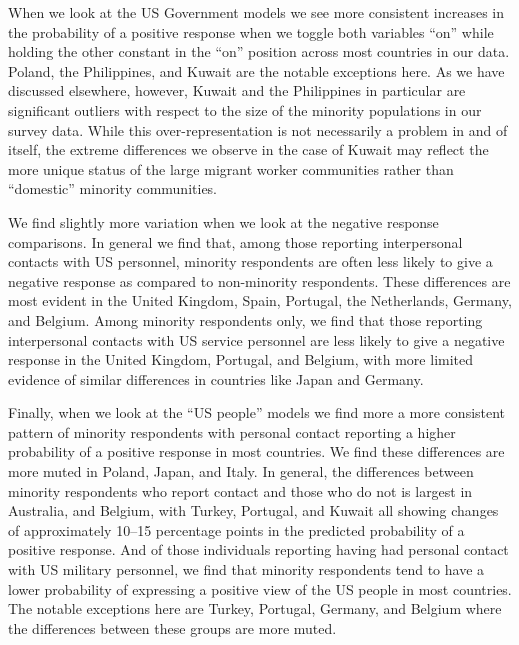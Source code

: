 When we look at the US Government models we see more consistent increases in the probability of a positive response when we toggle both variables ``on'' while holding the other constant in the ``on'' position across most countries in our data. Poland, the Philippines, and Kuwait are the notable exceptions here. As we have discussed elsewhere, however, Kuwait and the Philippines in particular are significant outliers with respect to the size of the minority populations in our survey data. While this over-representation is not necessarily a problem in and of itself, the extreme differences we observe in the case of Kuwait may reflect the more unique status of the large migrant worker communities rather than ``domestic'' minority communities.

We find slightly more variation when we look at the negative response comparisons. In general we find that, among those reporting interpersonal contacts with US personnel, minority respondents are often less likely to give a negative response as compared to non-minority respondents. These differences are most evident in the United Kingdom, Spain, Portugal, the Netherlands, Germany, and Belgium. Among minority respondents only, we find that those reporting interpersonal contacts with US service personnel are less likely to give a negative response in the United Kingdom, Portugal, and Belgium, with more limited evidence of similar differences in countries like Japan and Germany.

Finally, when we look at the ``US people'' models we find more a more consistent pattern of minority respondents with personal contact reporting a higher probability of a positive response in most countries. We find these differences are more muted in Poland, Japan, and Italy. In general, the differences between minority respondents who report contact and those who do not is largest in Australia, and Belgium, with Turkey, Portugal, and Kuwait all showing changes of approximately 10--15 percentage points in the predicted probability of a positive response. And of those individuals reporting having had personal contact with US military personnel, we find that minority respondents tend to have a lower probability of expressing a positive view of the US people in most countries. The notable exceptions here are Turkey, Portugal, Germany, and Belgium where the differences between these groups are more muted.

